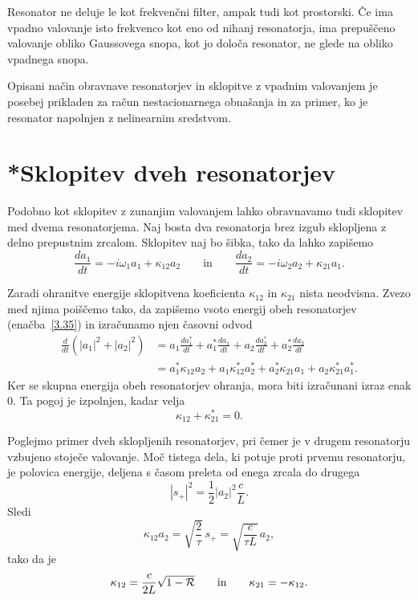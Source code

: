 Resonator ne deluje le kot frekvenčni filter, ampak tudi
kot prostorski. Če ima vpadno valovanje isto frekvenco kot
eno od nihanj resonatorja, ima prepuščeno valovanje obliko
Gaussovega snopa, kot jo določa resonator, ne glede na obliko vpadnega
snopa.

Opisani  način obravnave resonatorjev in sklopitve z vpadnim valovanjem
je posebej prikladen za račun nestacionarnega obnašanja in za primer,
ko je resonator napolnjen z nelinearnim sredstvom.

\section{*Sklopitev dveh resonatorjev}
Podobno kot sklopitev z zunanjim valovanjem lahko obravnavamo tudi
sklopitev med dvema resonatorjema. Naj bosta dva resonatorja brez izgub
sklopljena z delno prepustnim zrcalom. Sklopitev naj bo šibka, tako da lahko zapišemo 
\begin{equation}
\frac{da_1}{dt} =  -i\omega_{1}a_{1}+\kappa_{12}a_{2} \qquad \mathrm{in} \qquad 
\frac{da_2}{dt} = -i\omega_{2}a_{2}+\kappa_{21}a_{1}.
\end{equation}

Zaradi ohranitve energije sklopitvena koeficienta $\kappa_{12}$ in
$\kappa_{21}$ nista neodvisna. Zvezo med njima poiščemo tako, da zapišemo
vsoto energij obeh resonatorjev (enačba~\ref{3.35}) in izračunamo njen časovni odvod
\begin{align}
\frac{d}{dt}\left(|a_{1}|^{2}+|a_{2}|^{2}\right) & =  a_{1}\frac{da_1^*}{dt}+a_{1}^{*}\frac{da_1}{dt}+
a_{2}\frac{da_2^*}{dt}+a_{2}^{*}\frac{da_2}{dt}\nonumber \\
 & =  a_{1}^{*}\kappa_{12}a_{2}+a_{1}\kappa_{12}^{*}a_{2}^{*}+a_{2}^{*}\kappa_{21}a_{1}+
 a_{2}\kappa_{21}^{*}a_{1}^{*}.
\end{align}
Ker se skupna energija obeh resonatorjev ohranja, mora biti izračunani izraz enak  $0$.
Ta pogoj je izpolnjen, kadar velja
\begin{equation}
\kappa_{12}+\kappa_{21}^{*}=0.
\label{3.56}
\end{equation}

Poglejmo primer dveh sklopljenih resonatorjev, pri čemer je v drugem resonatorju vzbujeno 
stoječe valovanje. Moč tistega dela, ki potuje proti prvemu resonatorju,
je polovica energije, deljena s časom preleta od enega zrcala do drugega
\begin{equation}
|s_{+}|^{2}=\frac{1}{2}|a_{2}|^{2}\frac{c}{L}.
\label{3.57}
\end{equation}
Sledi
\begin{equation}
\kappa_{12}a_{2}=\sqrt{\frac{2}{\tau}}\, s_{+}=\sqrt{\frac{c}{\tau L}}\, a_{2},
\label{3.58}
\end{equation}
 tako da je 
\begin{equation}
\kappa_{12}=\frac{c}{2L}\sqrt{1-{\cal R}}\qquad \mathrm{in} \qquad \kappa_{21}=-\kappa_{12}.
\label{3.59}
\end{equation}

